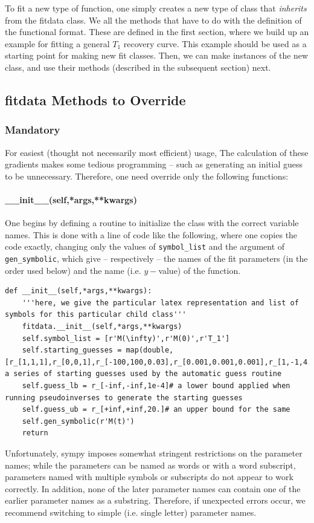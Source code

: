 To fit a new type of function,
    one simply creates a new type of class that
    {\it inherits} from the fitdata class.
We 
    all the methods that have to do with the definition
    of the functional format.
These are defined in the first section, where we build
    up an example for fitting a general $T_1$ recovery curve.
This example should be used as a starting point for making
    new fit classes.
Then, we can make instances of the new class,
    and use their methods (described in the subsequent section)
    next.
\subsection{fitdata Methods to Override}
\subsubsection{Mandatory}
For easiest (thought not necessarily most efficient) usage,
The calculation of these gradients makes some tedious
    programming -- such as generating an initial guess
    to be unnecessary.
Therefore, one need override only the following functions:
\paragraph{\_\_init\_\_(self,*args,**kwargs)}
One begins by defining a routine to initialize the class with the correct variable names.
This is done with a line of code like the following,
    where one copies the code exactly, changing only the
    values of {\tt symbol\_list} and 
    the argument of {\tt gen\_symbolic},
    which give -- respectively -- the names of the fit parameters
    (in the order used below)
    and the name (i.e. $y-$value) of the function.
\begin{lstlisting}
def __init__(self,*args,**kwargs):
    '''here, we give the particular latex representation and list of symbols for this particular child class'''
    fitdata.__init__(self,*args,**kwargs)
    self.symbol_list = [r'M(\infty)',r'M(0)',r'T_1']
    self.starting_guesses = map(double,[r_[1,1,1],r_[0,0,1],r_[-100,100,0.03],r_[0.001,0.001,0.001],r_[1,-1,4.0]])# a series of starting guesses used by the automatic guess routine
    self.guess_lb = r_[-inf,-inf,1e-4]# a lower bound applied when running pseudoinverses to generate the starting guesses
    self.guess_ub = r_[+inf,+inf,20.]# an upper bound for the same
    self.gen_symbolic(r'M(t)')
    return
\end{lstlisting}
Unfortunately, sympy imposes somewhat stringent
    restrictions on the parameter names;
    while the parameters can be named as words
    or with a word subscript, parameters
    named with multiple symbols or subscripts do
    not appear to work correctly.
In addition, none of the later parameter names
    can contain one of the earlier parameter names
    as a substring.
Therefore, if unexpected errors occur, we recommend switching
    to simple (i.e. single letter) parameter names.

